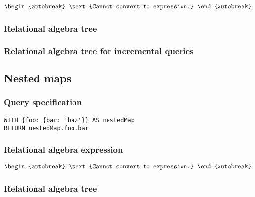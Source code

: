 \begin{align*}
\begin{autobreak}
\text{Cannot convert to expression.}
\end{autobreak}
\end{align*}

\subsubsection*{Relational algebra tree}


\subsubsection*{Relational algebra tree for incremental queries}


\subsection{Nested maps}

\subsubsection*{Query specification}

\begin{lstlisting}
WITH {foo: {bar: 'baz'}} AS nestedMap
RETURN nestedMap.foo.bar
\end{lstlisting}

\subsubsection*{Relational algebra expression}

\begin{align*}
\begin{autobreak}
\text{Cannot convert to expression.}
\end{autobreak}
\end{align*}

\subsubsection*{Relational algebra tree}



